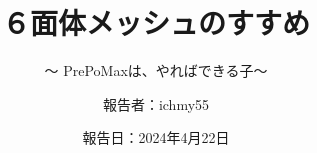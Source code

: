 %
\title{６面体メッシュのすすめ}
\subtitle{～ PrePoMaxは、やればできる子～}
%
%
%
\date[4-22-2024]{報告日：2024年4月22日}
\author[ichmy55]{報告者：ichmy55}
\subject{Usage example of PrePoMax}
